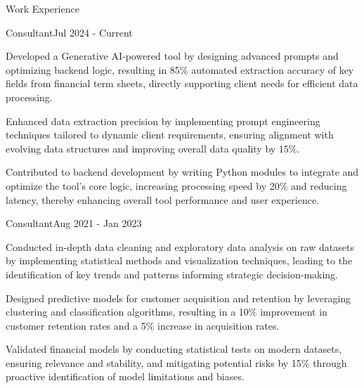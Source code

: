 \documentclass{resume} %
\begin{document}
    \begin{rSection}{Work Experience}
                    \begin{rSubsection}
                {Consultant}{Jul 2024 - Current}
                                    {}
                                {}
                                    \item Developed a Generative AI{-}powered tool by designing advanced prompts and optimizing backend logic, resulting in 85\% automated extraction accuracy of key fields from financial term sheets, directly supporting client needs for efficient data processing.
                                    \item Enhanced data extraction precision by implementing prompt engineering techniques tailored to dynamic client requirements, ensuring alignment with evolving data structures and improving overall data quality by 15\%.
                                    \item Contributed to backend development by writing Python modules to integrate and optimize the tool's core logic, increasing processing speed by 20\% and reducing latency, thereby enhancing overall tool performance and user experience.
                            \end{rSubsection}
                    \begin{rSubsection}
                {Consultant}{Aug 2021 - Jan 2023}
                                    {}
                                {}
                                    \item Conducted in{-}depth data cleaning and exploratory data analysis on raw datasets by implementing statistical methods and visualization techniques, leading to the identification of key trends and patterns informing strategic decision{-}making.
                                    \item Designed predictive models for customer acquisition and retention by leveraging clustering and classification algorithms, resulting in a 10\% improvement in customer retention rates and a 5\% increase in acquisition rates.
                                    \item Validated financial models by conducting statistical tests on modern datasets, ensuring relevance and stability, and mitigating potential risks by 15\% through proactive identification of model limitations and biases.

\end{rSubsection}
\end{rSection}
\end{document}
